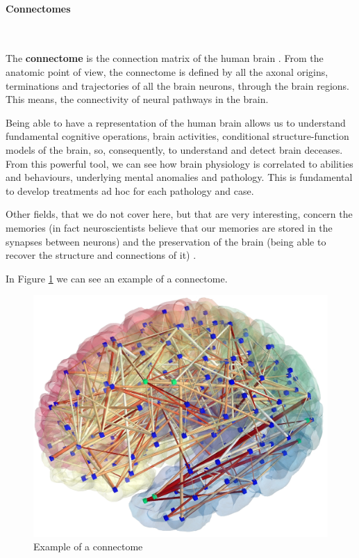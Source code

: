 \paragraph{Connectomes}\
\vspace{0.5cm}

The \textbf{connectome} is the connection matrix of the human brain \cite{connectome}. From the anatomic point of view, the connectome is defined by all the axonal origins, terminations and trajectories of all the brain neurons, through the brain regions. This means, the connectivity of neural pathways in the brain. 
\vspace{0.5cm}

Being able to have a representation of the human brain allows us to understand fundamental cognitive operations, brain activities, conditional structure-function models of the brain, so, consequently, to understand and detect brain deceases. From this powerful tool, we can see how brain physiology is correlated to abilities and behaviours, underlying mental anomalies and pathology. This is fundamental to develop treatments ad hoc for each pathology and case. 
\vspace{0.5cm}

Other fields, that we do not cover here, but that are very interesting, concern the memories (in fact neuroscientists believe that our memories are stored in the synapses between neurons) and the preservation of the brain (being able to recover the structure and connections of it) \cite{preservation}.
\vspace{0.5cm}

In Figure \ref{fig:diagram3} we can see an example of a connectome.
\vspace{0.5cm}

\begin{figure}[htbp]
	\centering
	\includegraphics[scale=0.08]{Immagini/cervello.jpg}
	\caption{Example of a connectome}
	\label{fig:diagram3}
\end{figure}

